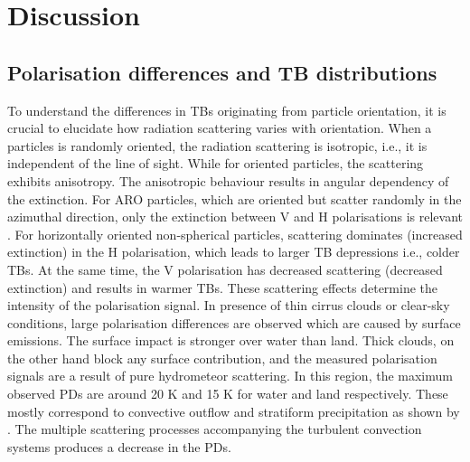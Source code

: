 \documentclass[amt, manuscript]{copernicus}
\begin{document}
\section{Discussion}

\subsection{Polarisation differences and TB distributions}
%
To understand the differences in TBs originating from particle orientation, it is crucial to elucidate how radiation scattering varies with orientation. When a particles is randomly oriented, the radiation scattering is isotropic, i.e., it is independent of the line of sight. While for oriented particles, the scattering exhibits anisotropy. The anisotropic behaviour results in angular dependency of the extinction. For ARO particles, which are oriented but scatter randomly in the azimuthal direction, only the extinction between V  and H polarisations is relevant \citep{brath:micro:20, barlakas:intro:21}. For horizontally oriented non-spherical particles, scattering dominates (increased extinction) in the H polarisation, which leads to larger TB depressions i.e., colder TBs. At the same time, the V polarisation has decreased scattering (decreased extinction) and results in warmer TBs. These scattering effects determine the intensity of the polarisation signal. In presence of thin cirrus clouds or clear-sky conditions, large polarisation differences are observed which are caused by surface emissions. The surface impact is stronger over water than land. Thick clouds, on the other hand block any surface contribution, and the measured polarisation signals are a result of pure hydrometeor scattering. In this region, the maximum observed PDs are around 20\,\,K and 15\,\,K for  water and land respectively. These mostly correspond to convective outflow and stratiform precipitation as shown by \citet{gong:micro:17}. The multiple scattering processes accompanying the turbulent convection systems produces a decrease in the PDs.
\end{document}
